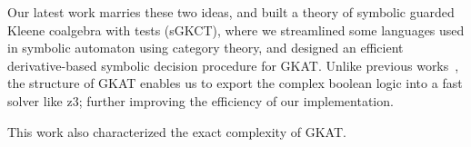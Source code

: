 \documentclass[11pt,a4paper,sans]{moderncv} %
\begin{document}
Our latest work marries these two ideas, and built a theory of symbolic guarded Kleene coalgebra with tests (sGKCT), where we streamlined some languages used in symbolic automaton using category theory, and designed an efficient derivative-based symbolic decision procedure for GKAT. 
Unlike previous works~\cite{pous_SymbolicAlgorithmsLanguage_2015}, the structure of GKAT enables us to export the complex boolean logic into a fast solver like z3; further improving the efficiency of our implementation.

This work also characterized the exact complexity of GKAT.






\printbibliography %
\end{document}
